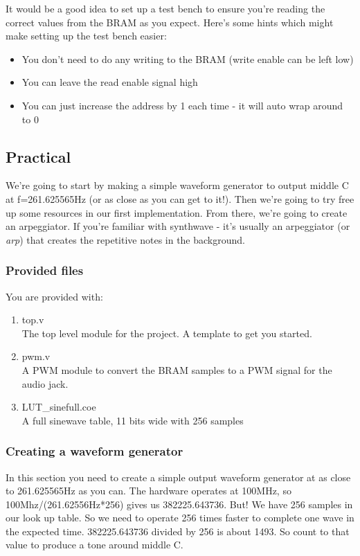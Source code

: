 It would be a good idea to set up a test bench to ensure you're reading the correct values from the BRAM as you expect. Here's some hints which might make setting up the test bench easier:
\begin{itemize}
    \item You don't need to do any writing to the BRAM (write enable can be left low)
    \item You can leave the read enable signal high
    \item You can just increase the address by 1 each time - it will auto wrap around to 0
\end{itemize}

\subsection{Practical}
We're going to start by making a simple waveform generator to output middle C at f=261.625565Hz (or as close as you can get to it!). Then we're going to try free up some resources in our first implementation. From there, we're going to create an arpeggiator. If you're familiar with synthwave - it's usually an arpeggiator (or \textit{arp}) that creates the repetitive notes in the background.

\subsubsection{Provided files}
You are provided with:
\begin{enumerate}
    \item top.v\\
    The top level module for the project. A template to get you started.
    \item pwm.v\\
    A PWM module to convert the BRAM samples to a PWM signal for the audio jack.
    \item LUT\_sinefull.coe\\
    A full sinewave table, 11 bits wide with 256 samples
\end{enumerate}

\subsubsection{Creating a waveform generator}
In this section you need to create a simple output waveform generator at as close to 261.625565Hz as you can. The hardware operates at 100MHz, so 100Mhz/(261.62556Hz*256) gives us 382225.643736. But! We have 256 samples in our look up table. So we need to operate 256 times faster to complete one wave in the expected time. 382225.643736 divided by 256 is about 1493. So count to that value to produce a tone around middle C.

